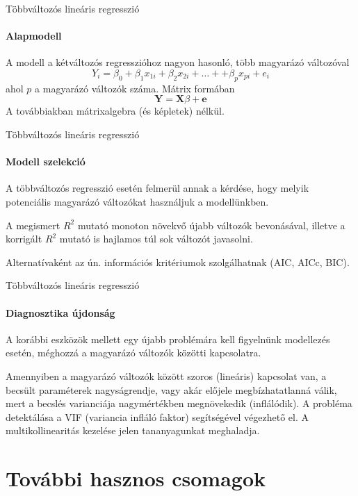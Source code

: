 \documentclass[10pt]{beamer}
\begin{document}
\begin{frame}{Többváltozós lineáris regresszió}
\framesubtitle{Alapmodell}
A modell a kétváltozós regresszióhoz nagyon hasonló, több magyarázó változóval
\[
Y_i = \beta_0 + \beta_1x_{1i}+ \beta_2x_{2i} + \dots + + \beta_px_{pi}+e_i
\]
ahol $p$ a magyarázó változók száma. Mátrix formában
\[
\mathbf{Y}=\mathbf{X}\beta + \mathbf{e}
\]
A továbbiakban mátrixalgebra (és képletek) nélkül.
\end{frame}

\begin{frame}{Többváltozós lineáris regresszió}
\framesubtitle{Modell szelekció}
A többváltozós regresszió esetén felmerül annak a kérdése, hogy melyik potenciális magyarázó változókat használjuk a modellünkben.

A megismert $R^2$ mutató monoton növekvő újabb változók bevonásával, illetve a korrigált $R^2$ mutató is hajlamos túl sok változót javasolni.

Alternatívaként az ún. információs kritériumok szolgálhatnak (AIC, AICc, BIC).
\end{frame}

\begin{frame}{Többváltozós lineáris regresszió}
\framesubtitle{Diagnosztika újdonság}
A korábbi eszközök mellett egy újabb problémára kell figyelnünk modellezés esetén, méghozzá a magyarázó változók közötti kapcsolatra.

Amennyiben a magyarázó változók között szoros (lineáris) kapcsolat van, a becsült paraméterek nagyságrendje, vagy akár előjele megbízhatatlanná válik, mert a becslés varianciája nagymértékben megnövekedik (inflálódik). A probléma detektálása a VIF (variancia infláló faktor) segítségével végezhető el. A multikollinearitás kezelése jelen tananyagunkat meghaladja.
\end{frame}

\section{További hasznos csomagok}
\end{document}
